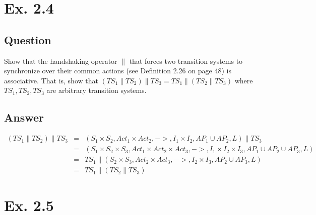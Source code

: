 \documentclass[12pt]{article}
\begin{document}
\newpage
\section*{Ex. 2.4}
\subsection*{Question}
Show that the handshaking operator $\|$ that forces two transition systems to
synchronize over their common actions (see Definition 2.26 on page 48) is associative. That is,
show that
$(TS_1\|TS_2)\|TS_3 = TS_1\|(TS_2\|TS_3)$
where $TS_1, TS_2, TS_3$ are arbitrary transition systems.

\subsection*{Answer}
$\begin{array}{lcl}
	(TS_1\|TS_2)\|TS_3 & = & (S_1\times S_2, Act_1 \times Act_2, ->, I_1 \times I_2, AP_1\cup AP_2, L)\|TS_3\\
	 & = &(S_1 \times S_2 \times S_3, Act_1 \times Act_2 \times Act_3, ->, I_1 \times I_2 \times I_3, AP_1\cup AP_2 \cup AP_3, L)\\
	 & = & TS_1\|(S_2 \times S_3, Act_2 \times Act_3, ->, I_2 \times I_3, AP_2\cup AP_3, L)\\
	 & = & TS_1\|(TS_2\|TS_3)
\end{array}$

\newpage
\section*{Ex. 2.5}
\end{document}
